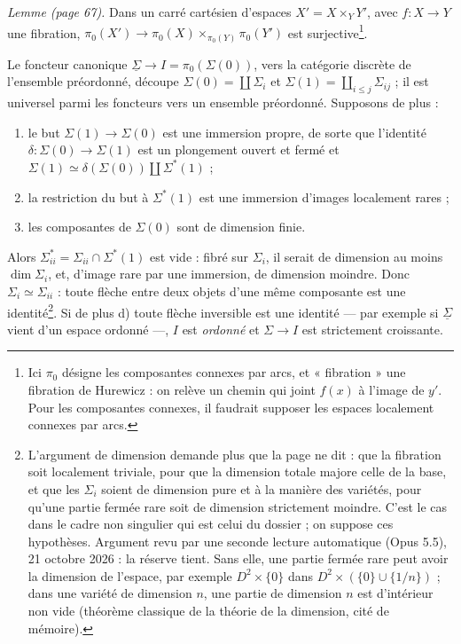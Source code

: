 \documentclass[11pt,a4paper]{article}
\begin{document}
\emph{Lemme (page 67).} Dans un carré cartésien d'espaces $X' = X \times_Y Y'$, avec
$f : X \to Y$ une fibration, $\pi_0(X') \to \pi_0(X) \times_{\pi_0(Y)} \pi_0(Y')$ est
surjective\footnote{Ici $\pi_0$ désigne les composantes connexes par arcs, et
« fibration » une fibration de Hurewicz : on relève un chemin qui joint $f(x)$ à
l'image de $y'$. Pour les composantes connexes, il faudrait supposer les espaces
localement connexes par arcs.}.

Le foncteur canonique $\underline{\Sigma} \to I = \pi_0(\Sigma(0))$, vers la
catégorie discrète de l'ensemble préordonné, découpe $\Sigma(0) = \coprod \Sigma_i$ et
$\Sigma(1) = \coprod_{i \leq j} \Sigma_{ij}$ ; il est universel parmi les foncteurs
vers un ensemble préordonné. Supposons de plus :
\begin{enumerate}
\item[a)] le but $\Sigma(1) \to \Sigma(0)$ est une immersion propre, de sorte que
l'identité $\delta : \Sigma(0) \to \Sigma(1)$ est un plongement ouvert et fermé et
$\Sigma(1) \simeq \delta(\Sigma(0)) \amalg \Sigma^{*}(1)$ ;
\item[b)] la restriction du but à $\Sigma^{*}(1)$ est une immersion d'images
localement rares ;
\item[c)] les composantes de $\Sigma(0)$ sont de dimension finie.
\end{enumerate}
Alors $\Sigma^{*}_{ii} = \Sigma_{ii} \cap \Sigma^{*}(1)$ est vide : fibré sur
$\Sigma_i$, il serait de dimension au moins $\dim \Sigma_i$, et, d'image rare par une
immersion, de dimension moindre. Donc $\Sigma_i \simeq \Sigma_{ii}$ : toute flèche
entre deux objets d'une même composante est une identité\footnote{L'argument de
dimension demande plus que la page ne dit : que la fibration soit localement
triviale, pour que la dimension totale majore celle de la base, et que les $\Sigma_i$
soient de dimension pure et à la manière des variétés, pour qu'une partie fermée
rare soit de dimension strictement moindre. C'est le cas dans le cadre non singulier qui est celui du dossier ; on suppose ces hypothèses. Argument revu par une seconde lecture automatique (Opus 5.5), 21 octobre 2026 : la réserve tient. Sans elle, une partie fermée rare peut avoir la dimension de l'espace, par exemple $D^{2} \times \{0\}$ dans $D^{2} \times (\{0\} \cup \{1/n\})$ ; dans une variété de dimension $n$, une partie de dimension $n$ est d'intérieur non vide (théorème classique de la théorie de la dimension, cité de mémoire).}. Si de plus d) toute flèche
inversible est une identité — par exemple si $\underline{\Sigma}$ vient d'un espace
ordonné —, $I$ est \emph{ordonné} et $\Sigma \to I$ est strictement croissante.
\end{document}
